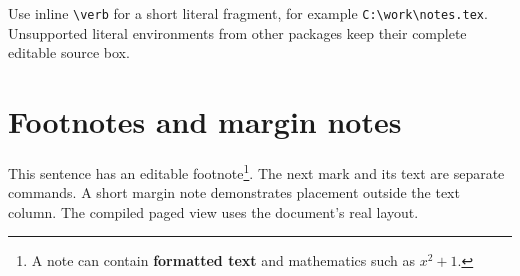 \documentclass{article}
\begin{document}
Use inline \verb|\verb| for a short literal fragment, for example
\verb|C:\work\notes.tex|. Unsupported literal environments from other packages
keep their complete editable source box.
\section{Footnotes and margin notes}
This sentence has an editable footnote\footnote{A note can contain
\textbf{formatted text} and mathematics such as $x^2+1$.}.
The next mark and its text are separate commands\footnotemark.
A short margin note demonstrates placement
outside the text column. The compiled paged view uses the document's real layout.
\end{document}
